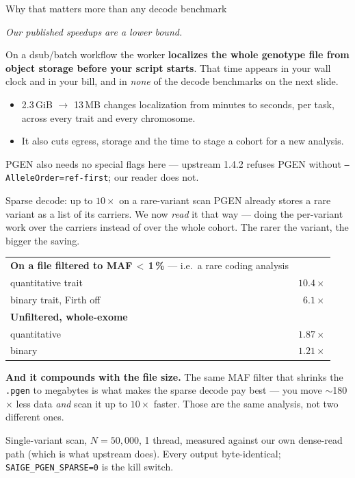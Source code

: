 \documentclass[aspectratio=169,11pt]{beamer}
\newcommand{\win}[1]{\textcolor{good}{\textbf{#1}}}
\begin{document}
\begin{frame}{Why that matters more than any decode benchmark}
\begin{center}
\emph{Our published speedups are a lower bound.}
\end{center}

\medskip
On a dsub/batch workflow the worker \textbf{localizes the whole genotype file from
object storage before your script starts}. That time appears in your wall clock
and in your bill, and in \emph{none} of the decode benchmarks on the next slide.

\medskip
\begin{itemize}
  \item 2.3\,GiB $\to$ 13\,MB changes localization from minutes to seconds, per
        task, across every trait and every chromosome.
  \item It also cuts egress, storage and the time to stage a cohort for a new
        analysis.
\end{itemize}

\medskip
PGEN also needs no special flags here --- upstream 1.4.2 refuses PGEN without
\texttt{--AlleleOrder=ref-first}; our reader does not.
\end{frame}

\begin{frame}{Sparse decode: up to $10\times$ on a rare-variant scan}
PGEN already stores a rare variant as a list of its carriers. We now \emph{read}
it that way --- doing the per-variant work over the carriers instead of over the
whole cohort. The rarer the variant, the bigger the saving.

\medskip
\begin{center}
\begin{tabular}{lr}
\toprule
\textbf{On a file filtered to MAF\,$<$\,1\,\%} --- i.e.\ a rare coding analysis & \\
\quad quantitative trait & \win{$10.4\times$} \\
\quad binary trait, Firth off & \win{$6.1\times$} \\
\addlinespace
\textbf{Unfiltered, whole-exome} & \\
\quad quantitative & \win{$1.87\times$} \\
\quad binary & $1.21\times$ \\
\bottomrule
\end{tabular}
\end{center}

\medskip
\textbf{And it compounds with the file size.} The same MAF filter that shrinks
the \texttt{.pgen} to megabytes is what makes the sparse decode pay best --- you
move $\sim$180$\times$ less data \emph{and} scan it up to $10\times$ faster. Those
are the same analysis, not two different ones.

\medskip
{\footnotesize Single-variant scan, $N=50{,}000$, 1 thread, measured against our
own dense-read path (which is what upstream does). Every output byte-identical;
\texttt{SAIGE\_PGEN\_SPARSE=0} is the kill switch.}
\end{frame}
\end{document}
